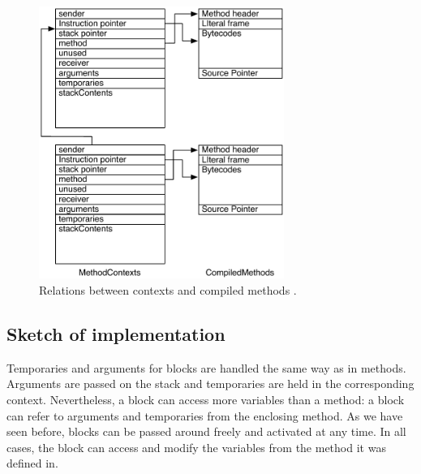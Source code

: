 \documentclass[a4paper,10pt,twoside]{book}
\begin{document}

\begin{figure}
\begin{center}
\includegraphics[width=8cm]{MethodAndMethodContext}
\caption{Relations between contexts and compiled methods \label{fig:MethodAndMethodContext}.}
\end{center}
\end{figure}

\subsection{Sketch of implementation}

Temporaries and arguments for blocks are handled the same way as in methods.
Arguments are passed on the stack and temporaries are held in the corresponding context.
Nevertheless, a block can access more variables than a method:
a block can refer to arguments and temporaries from the enclosing method.
As we have seen before, blocks can be passed around freely and activated at any time.
In all cases, the block can access and modify the variables from the method it was defined in.


\end{document}
